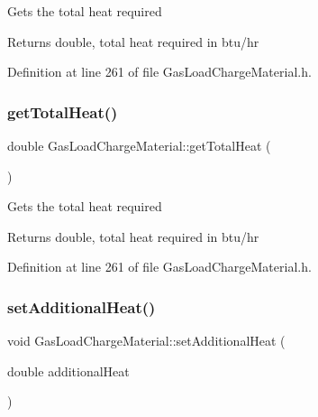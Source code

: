 Gets the total heat required \begin{DoxyReturn}{Returns}
double, total heat required in btu/hr 
\end{DoxyReturn}


Definition at line 261 of file Gas\+Load\+Charge\+Material.\+h.

\mbox{\label{class_gas_load_charge_material_a4f831537652ca09c4539982c626cc164}} 
\subsubsection{\texorpdfstring{get\+Total\+Heat()}{getTotalHeat()}\hspace{0.1cm}{\footnotesize\ttfamily [3/3]}}
{\footnotesize\ttfamily double Gas\+Load\+Charge\+Material\+::get\+Total\+Heat (\begin{DoxyParamCaption}{ }\end{DoxyParamCaption})\hspace{0.3cm}{\ttfamily [inline]}}

Gets the total heat required \begin{DoxyReturn}{Returns}
double, total heat required in btu/hr 
\end{DoxyReturn}


Definition at line 261 of file Gas\+Load\+Charge\+Material.\+h.

\mbox{\label{class_gas_load_charge_material_a08ef5196ea9919dfc71be6744c7da08e}} 
\subsubsection{\texorpdfstring{set\+Additional\+Heat()}{setAdditionalHeat()}\hspace{0.1cm}{\footnotesize\ttfamily [1/3]}}
{\footnotesize\ttfamily void Gas\+Load\+Charge\+Material\+::set\+Additional\+Heat (\begin{DoxyParamCaption}\item[{double}]{additional\+Heat }\end{DoxyParamCaption})\hspace{0.3cm}{\ttfamily [inline]}}


